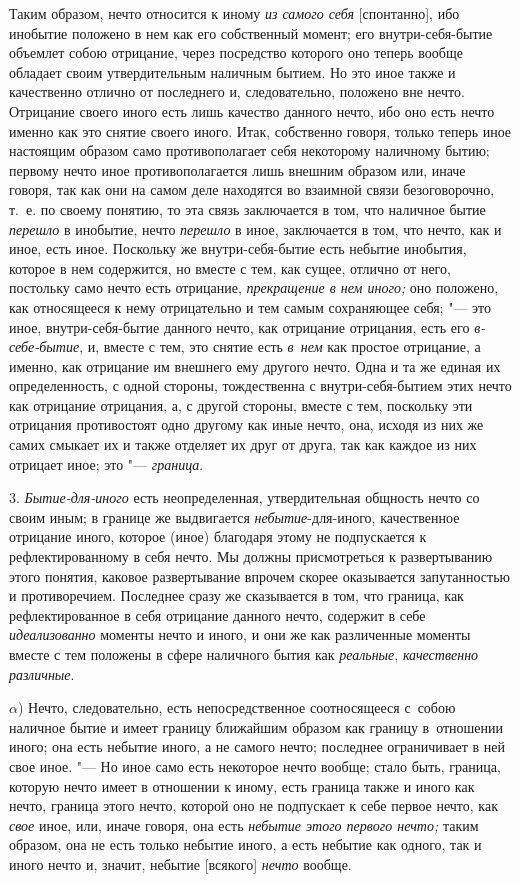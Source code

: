 Таким образом, нечто относится к иному {\em из самого
себя} [спонтанно], ибо инобытие положено в нем как его собственный
момент; его внутри-себя-бытие объемлет собою отрицание, через посредство
которого оно теперь вообще обладает своим утвердительным наличным бытием.
Но это иное также и качественно отлично от последнего и, следовательно,
положено вне нечто. Отрицание своего иного есть лишь качество данного
нечто, ибо оно есть нечто именно как это снятие своего иного. Итак,
собственно говоря, только теперь иное настоящим образом само
противополагает себя некоторому наличному бытию; первому нечто иное
противополагается лишь внешним образом или, иначе говоря, так как они на
самом деле находятся во взаимной связи безоговорочно, т.~е. по своему
понятию, то эта связь заключается в том, что наличное бытие
{\em перешло} в инобытие, нечто
{\em перешло} в иное, заключается в том, что нечто,
как и иное, есть иное. Поскольку же внутри-себя-бытие есть небытие
инобытия, которое в нем содержится, но вместе с тем, как сущее, отлично от
него, постольку само нечто есть отрицание,
{\em прекращение в нем иного;} оно
положено, как относящееся к нему отрицательно и тем самым сохраняющее себя;
"--- это иное, внутри-себя-бытие данного нечто, как отрицание отрицания,
есть его {\em в-себе-бытие}, и, вместе с тем, это
снятие есть {\em в~нем} как простое отрицание, а
именно, как отрицание им внешнего ему другого нечто. Одна и та же единая их
определенность, с одной стороны, тождественна с внутри-себя-бытием этих
нечто как отрицание отрицания, а, с другой стороны, вместе с тем, поскольку
эти отрицания противостоят одно другому как иные нечто, она,
исходя из них же самих смыкает их и также отделяет их друг от друга,
так как каждое из них отрицает иное; это "--- {\em граница}.

3. {\em Бытие-для-иного} есть неопределенная,
утвердительная общность нечто со своим иным; в границе же выдвигается
{\em небытие}-для-иного, качественное отрицание
иного, которое (иное) благодаря этому не подпускается к
рефлектированному в себя нечто. Мы должны присмотреться к развертыванию
этого понятия, каковое развертывание впрочем скорее оказывается
запутанностью и противоречием. Последнее сразу же сказывается в том, что
граница, как рефлектированное в себя отрицание данного нечто, содержит в
себе {\em идеализованно} моменты нечто и иного, и они
же как различенные моменты вместе с тем положены в сфере наличного бытия
как {\em реальные},
{\em качественно различные}.

$\alpha$) Нечто, следовательно, есть непосредственное соотносящееся
с~собою наличное бытие и имеет границу ближайшим образом как границу
в~отношении иного; она есть небытие иного, а не самого нечто; последнее
ограничивает в ней свое иное. "--- Но иное само есть некоторое нечто вообще;
стало быть, граница, которую нечто имеет в отношении к иному, есть граница
также и иного как нечто, граница этого нечто, которой оно не подпускает к себе
первое нечто, как {\em свое} иное, или, иначе говоря, она есть
{\em небытие этого первого нечто;} таким образом, она не есть только небытие
иного, а есть небытие как одного, так и иного нечто и, значит, небытие
[всякого] {\em нечто} вообще.

